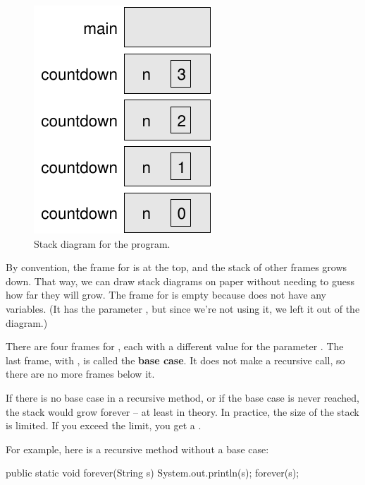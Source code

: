 \begin{figure}[!ht]
\begin{center}
\includegraphics{figs/stack2.pdf}
\caption{Stack diagram for the  program.}
\label{fig.stack2}
\end{center}
\end{figure}

By convention, the frame for  is at the top, and the stack of other frames grows down.
That way, we can draw stack diagrams on paper without needing to guess how far they will grow.
The frame for  is empty because  does not have any variables.
(It has the parameter , but since we're not using it, we left it out of the diagram.)


There are four frames for , each with a different value for the parameter .
The last frame, with , is called the {\bf base case}.
It does not make a recursive call, so there are no more frames below it.


If there is no base case in a recursive method, or if the base case is never reached, the stack would grow forever -- at least in theory.
In practice, the size of the stack is limited.
If you exceed the limit, you get a .

For example, here is a recursive method without a base case:

\begin{code}
public static void forever(String s) {
    System.out.println(s);
    forever(s);
}
\end{code}

